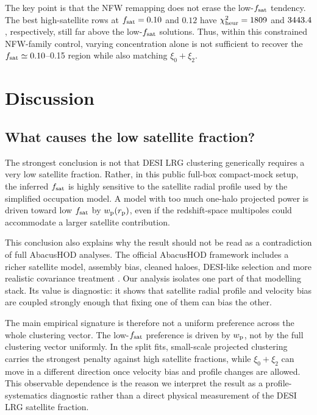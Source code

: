 \documentclass[fleqn,usenatbib]{mnras}
\newcommand{\fsat}{f_{\rm sat}}
\newcommand{\wproj}{w_{\rm p}}
\newcommand{\xizero}{\xi_0}
\newcommand{\xitwo}{\xi_2}
\begin{document}
The key point is that the NFW remapping does not erase the low-$\fsat$ tendency.  The best high-satellite rows at $\fsat=0.10$ and $0.12$ have $\chi^2_{\rm heur}=1809$ and $3443.4$, respectively, still far above the low-$\fsat$ solutions.  Thus, within this constrained NFW-family control, varying concentration alone is not sufficient to recover the $\fsat\simeq0.10$--0.15 region while also matching $\xizero+\xitwo$.

\section{Discussion}
\label{sec:discussion}

\subsection{What causes the low satellite fraction?}

The strongest conclusion is not that DESI LRG clustering generically requires a very low satellite fraction.  Rather, in this public full-box compact-mock setup, the inferred $\fsat$ is highly sensitive to the satellite radial profile used by the simplified occupation model.  A model with too much one-halo projected power is driven toward low $\fsat$ by $\wproj(r_{\rm p})$, even if the redshift-space multipoles could accommodate a larger satellite contribution.

This conclusion also explains why the result should not be read as a contradiction of full AbacusHOD analyses.  The official AbacusHOD framework includes a richer satellite model, assembly bias, cleaned haloes, DESI-like selection and more realistic covariance treatment \citep{Yuan2022,Yuan2024}.  Our analysis isolates one part of that modelling stack.  Its value is diagnostic: it shows that satellite radial profile and velocity bias are coupled strongly enough that fixing one of them can bias the other.

The main empirical signature is therefore not a uniform preference across the whole clustering vector.  The low-$\fsat$ preference is driven by $\wproj$, not by the full clustering vector uniformly.  In the split fits, small-scale projected clustering carries the strongest penalty against high satellite fractions, while $\xizero+\xitwo$ can move in a different direction once velocity bias and profile changes are allowed.  This observable dependence is the reason we interpret the result as a profile-systematics diagnostic rather than a direct physical measurement of the DESI LRG satellite fraction.
\end{document}
